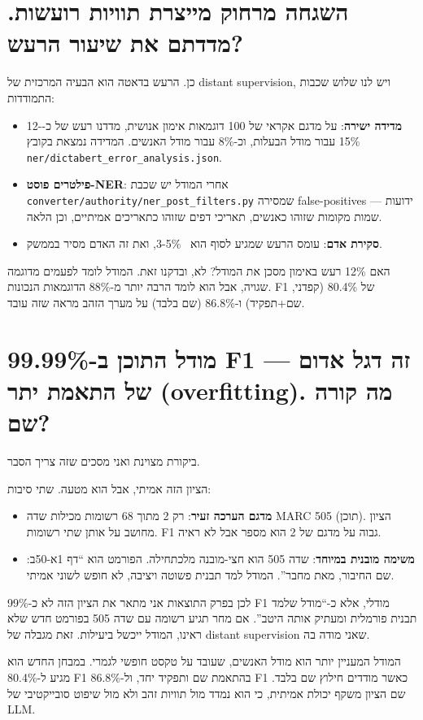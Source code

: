 \documentclass[12pt,a4paper]{article}
\begin{document}
\section{\texthebrew{השגחה מרחוק מייצרת תוויות רועשות. מדדתם את שיעור הרעש?}}
\begin{hebrew}
כן. הרעש בדאטה הוא הבעיה המרכזית של distant supervision, ויש לנו שלוש שכבות התמודדות:
\begin{itemize}
  \item \textbf{מדידה ישירה}: על מדגם אקראי של 100 דוגמאות אימון אנושית, מדדנו רעש של כ-12-15\% עבור מודל הבעלות, וכ-8\% עבור מודל האנשים. המדידה נמצאת בקובץ \texttt{ner/dictabert\_error\_analysis.json}.
  \item \textbf{פילטרים פוסט-NER}: אחרי המודל יש שכבת \texttt{converter/authority/ner\_post\_filters.py} שמסירה false-positives ידועות --- שמות מקומות שזוהו כאנשים, תאריכי דפים שזוהו כתאריכים אמיתיים, וכן הלאה.
  \item \textbf{סקירת אדם}: עומס הרעש שמגיע לסוף הוא ~3-5\%, ואת זה האדם מסיר בממשק.
\end{itemize}
\par
האם 12\% רעש באימון מסכן את המודל? לא, ובדקנו זאת. המודל לומד לפעמים מדוגמה שגויה, אבל הוא לומד הרבה יותר מ-88\% הדוגמאות הנכונות. F1 של 80.4\% (קפדני, שם+תפקיד) ו-86.8\% (שם בלבד) על מערך הזהב מראה שזה עובד.
\end{hebrew}


\section{\texthebrew{מודל התוכן ב-99.99\% F1 — זה דגל אדום של התאמת יתר (overfitting). מה קורה שם?}}
\begin{hebrew}
ביקורת מצוינת ואני מסכים שזה צריך הסבר.
\par
הציון הזה אמיתי, אבל הוא מטעה. שתי סיבות:
\begin{itemize}
  \item \textbf{מדגם הערכה זעיר}: רק 2 מתוך 68 רשומות מכילות שדה MARC 505 (תוכן). הציון מחושב על אותן שתי רשומות. F1 גבוה על מדגם של 2 הוא מספר אבל לא ראיה.
  \item \textbf{משימה מובנית במיוחד}: שדה 505 הוא חצי-מובנה מלכתחילה. הפורמט הוא ``דף 1א-50ב: שם החיבור, מאת מחבר''. המודל למד תבנית פשוטה ויציבה, לא חופש לשוני אמיתי.
\end{itemize}
\par
לכן בפרק התוצאות אני מתאר את הציון הזה לא כ-99\% F1 מודלי, אלא כ-``מודל שלמד תבנית פורמלית ומעתיק אותה היטב''. אם מחר תגיע רשומה עם שדה 505 בפורמט חדש שלא ראינו, המודל ייכשל ביעילות. זאת מגבלה של distant supervision שאני מודה בה.
\par
המודל המעניין יותר הוא מודל האנשים, שעובד על טקסט חופשי לגמרי. במבחן החדש הוא מגיע ל-80.4\% F1 בהתאמת שם ותפקיד יחד, ול-86.8\% F1 כאשר מודדים חילוץ שם בלבד. שם הציון משקף יכולת אמיתית, כי הוא נמדד מול תוויות זהב ולא מול שיפוט סובייקטיבי של LLM.
\end{hebrew}
\end{document}
